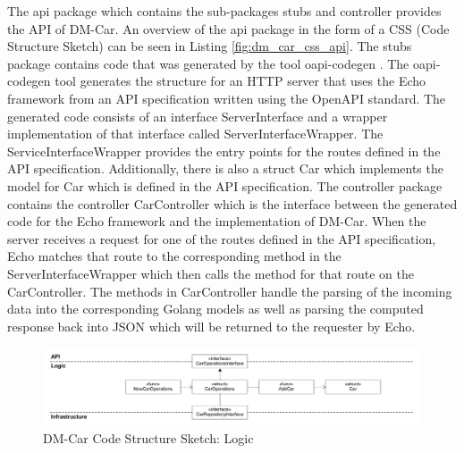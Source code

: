 The api package which contains the sub-packages stubs and controller provides the API of DM-Car.
An overview of the api package in the form of a CSS (Code Structure Sketch) can be seen in Listing \ref{fig:dm_car_css_api}.
The stubs package contains code that was generated by the tool oapi-codegen \cite{DEE-OAPI}.
The oapi-codegen tool generates the structure for an HTTP server that uses the Echo framework \cite{LAB-DOCS}
from an API specification written using the OpenAPI standard.
The generated code consists of an interface ServerInterface and a wrapper implementation of that interface
called ServerInterfaceWrapper. The ServiceInterfaceWrapper provides the entry
points for the routes defined in the API specification. Additionally, there is
also a struct Car which implements the model for Car which is defined in the
API specification. The controller package contains the controller CarController
which is the interface between the generated code for the Echo framework and
the implementation of DM-Car. When the server receives a request for one of the
routes defined in the API specification, Echo matches that route to the
corresponding method in the ServerInterfaceWrapper which then calls the method
for that route on the CarController. The methods in CarController handle the
parsing of the incoming data into the corresponding Golang models as well as
parsing the computed response back into JSON which will be returned to the
requester by Echo.

\begin{figure}[tb]
	\centering
	\includegraphics[width=\textwidth]{figures/8.8_dm_car_css_logic.png}
	\caption{DM-Car Code Structure Sketch: Logic}
	\label{fig:dm_car_css_logic}
\end{figure}

